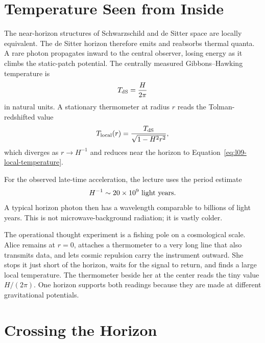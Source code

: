 \section{Temperature Seen from Inside}

The near-horizon structures of Schwarzschild and de Sitter space are locally equivalent. The de Sitter horizon therefore emits and reabsorbs thermal quanta. A rare photon propagates inward to the central observer, losing energy as it climbs the static-patch potential. The centrally measured Gibbons--Hawking temperature is
\begin{equation}
T_{\rm dS}=\frac{H}{2\pi}
\label{eq:l09-de-sitter-temperature}
\end{equation}
in natural units. A stationary thermometer at radius \(r\) reads the Tolman-redshifted value
\begin{equation}
T_{\rm local}(r)=
\frac{T_{\rm dS}}{\sqrt{1-H^2r^2}},
\label{eq:l09-tolman}
\end{equation}
which diverges as \(r\to H^{-1}\) and reduces near the horizon to Equation~\eqref{eq:l09-local-temperature}.


For the observed late-time acceleration, the lecture uses the period estimate
\begin{equation}
H^{-1}\sim 20\times10^9\ {\rm light\ years}.
\label{eq:l09-lecture-horizon-estimate}
\end{equation}
A typical horizon photon then has a wavelength comparable to billions of light years. This is not microwave-background radiation; it is vastly colder.

The operational thought experiment is a fishing pole on a cosmological scale. Alice remains at \(r=0\), attaches a thermometer to a very long line that also transmits data, and lets cosmic repulsion carry the instrument outward. She stops it just short of the horizon, waits for the signal to return, and finds a large local temperature. The thermometer beside her at the center reads the tiny value \(H/(2\pi)\). One horizon supports both readings because they are made at different gravitational potentials.

\section{Crossing the Horizon}

